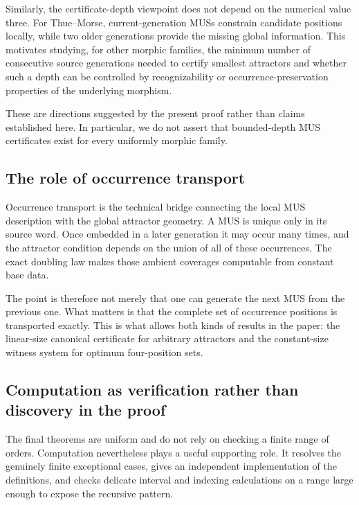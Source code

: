 \documentclass[10pt,a4paper]{article}
\theoremstyle{definition}\newtheorem{definition}[theorem]{Definition}
\theoremstyle{remark}\newtheorem{remark}[theorem]{Remark}
\begin{document}
Similarly, the certificate-depth viewpoint does not depend on the numerical value three.  For Thue--Morse, current-generation MUSs constrain candidate positions locally, while two older generations provide the missing global information.  This motivates studying, for other morphic families, the minimum number of consecutive source generations needed to certify smallest attractors and whether such a depth can be controlled by recognizability or occurrence-preservation properties of the underlying morphism.

These are directions suggested by the present proof rather than claims established here.  In particular, we do not assert that bounded-depth MUS certificates exist for every uniformly morphic family.

\subsection{The role of occurrence transport}
\label{subsec:role-occurrence-transport}

Occurrence transport is the technical bridge connecting the local MUS description with the global attractor geometry.  A MUS is unique only in its source word.  Once embedded in a later generation it may occur many times, and the attractor condition depends on the union of all of these occurrences.  The exact doubling law makes those ambient coverages computable from constant base data.

The point is therefore not merely that one can generate the next MUS from the previous one.  What matters is that the complete set of occurrence positions is transported exactly.  This is what allows both kinds of results in the paper: the linear-size canonical certificate for arbitrary attractors and the constant-size witness system for optimum four-position sets.

\subsection{Computation as verification rather than discovery in the proof}
\label{subsec:role-computation}

The final theorems are uniform and do not rely on checking a finite range of orders.  Computation nevertheless plays a useful supporting role.  It resolves the genuinely finite exceptional cases, gives an independent implementation of the definitions, and checks delicate interval and indexing calculations on a range large enough to expose the recursive pattern.
\end{document}
